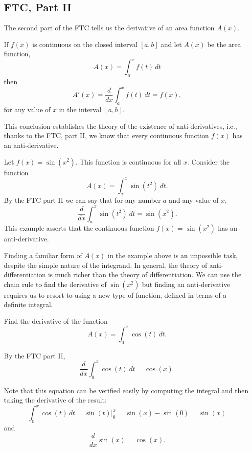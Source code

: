 \documentclass{ximera}
\begin{document}
\subsection{FTC, Part II}

The second part of the FTC tells us the derivative of an area function $A(x)$.  


\begin{theorem}
If $f(x)$ is continuous on the closed interval $[a, b]$ and let $A(x)$ be the area function,
\[
A(x) = \int_a^x f(t) \, dt
\]
then 
\[A'(x) = \frac{d}{dx}\int_a^x f(t) \, dt = f(x), \]
for any value of $x$ in the interval $[a, b]$.
\end{theorem}

This conclusion establishes the theory of the existence of anti-derivatives, i.e., thanks to the FTC, part II, we know that every continuous function $f(x)$ has an anti-derivative. 




\begin{example}[example 2]
 Let $f(x) = \sin(x^2)$.  This function is continuous for all $x$.  Consider the function
\[A(x) = \int_a^x \sin(t^2) \ dt.\]
By the FTC part II
we can say that for any number $a$ and any value of $x$, 
\[\frac{d}{dx}\int_a^x \sin(t^2) \ dt = \sin(x^2).\]
This example asserts that the continuous function $f(x) = \sin(x^2)$ has an anti-derivative.  
\end{example}



\begin{remark}
Finding a familiar form of $A(x)$ in the example above is an impossible task, despite the simple nature of the integrand.  
In general, the theory of anti-differentiation is much richer than the theory of differentiation. 
We can use the chain rule to find the derivative of $\sin(x^2)$ but finding an anti-derivative requires us to resort to 
using a new type of function, defined in terms of a definite integral.
\end{remark}


\begin{example}[example 3]
Find the derivative of the function
\[A(x) = \int_0^x \cos(t) \ dt.\]

By the FTC part II,
\[\frac{d}{dx}\int_0^x \cos(t) \ dt = \cos(x).\]
 
Note that this equation can be verified easily by computing the integral and then taking the derivative of the result:
\[\int_0^x \cos(t) \ dt = \sin(t) \Big|_0^x = \sin(x) - \sin(0) = \sin(x)\]
and 
\[\frac{d}{dx} \sin(x) = \cos(x).\]
\end{example}
\end{document}
